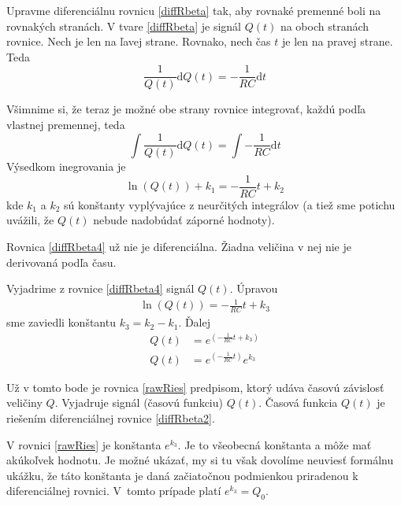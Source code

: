 \documentclass[a4paper, 10pt, ]{article}
\begin{document}
Upravme diferenciálnu rovnicu \eqref{diffRbeta} tak, aby rovnaké premenné boli na rovnakých stranách. V tvare \eqref{diffRbeta} je signál $Q(t)$ na oboch stranách rovnice. Nech je len na ľavej strane. Rovnako, nech čas $t$ je len na pravej strane. Teda
\begin{equation} \label{diffRbeta2}
    \frac{1}{Q(t)}\text{d}Q(t) = - \frac{1}{RC} \text{d}t
\end{equation}

Všimnime si, že teraz je možné obe strany rovnice integrovať, každú podľa vlastnej premennej, teda
\begin{equation} \label{diffRbeta3}
    \int \frac{1}{Q(t)}\text{d}Q(t) =  \int - \frac{1}{RC} \text{d}t
\end{equation}
Výsedkom inegrovania je
\begin{equation} \label{diffRbeta4}
     \ln \left(  Q(t)  \right) + k_1 =   - \frac{1}{RC} t + k_2
\end{equation}
kde $k_1$ a $k_2$ sú konštanty vyplývajúce z neurčitých integrálov (a tiež sme potichu uvážili, že $Q(t)$ nebude nadobúdať záporné hodnoty).





Rovnica \eqref{diffRbeta4} už nie je diferenciálna. Žiadna veličina v nej nie je derivovaná podľa času.

Vyjadrime z rovnice \eqref{diffRbeta4} signál $Q(t)$. Úpravou
\begin{align}
    \ln \left(  Q(t)  \right)  =   - \frac{1}{RC} t + k_3
\end{align}
sme zaviedli konštantu $k_3 = k_2 - k_1$. Ďalej
\begin{subequations}
    \begin{align}
        Q(t)   &=  e^{\left( - \frac{1}{RC} t + k_3 \right)} \\
        Q(t)   &=  e^{\left( - \frac{1}{RC} t \right)}  e^{k_3} \label{rawRies}
    \end{align}
\end{subequations}

Už v tomto bode je rovnica \eqref{rawRies} predpisom, ktorý udáva časovú závislosť veličiny $Q$. Vyjadruje signál (časovú funkciu) $Q(t)$. Časová funkcia $Q(t)$ je riešením diferenciálnej rovnice \eqref{diffRbeta2}.

V rovnici \eqref{rawRies} je konštanta $e^{k_3}$. Je to všeobecná konštanta a môže mať akúkoľvek hodnotu. Je možné ukázať, my si tu však dovolíme neuviesť formálnu ukážku, že táto konštanta je daná začiatočnou podmienkou priradenou k diferenciálnej rovnici. V~tomto prípade platí $e^{k_3} = Q_0$.
\end{document}
